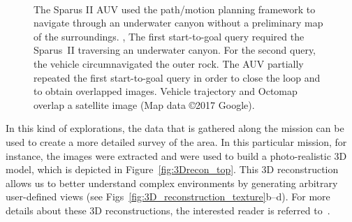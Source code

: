 \begin{figure}[htbp]
\myfloatalign
   	\quad
   	\\
   	\quad
\caption[The Sparus II AUV using the path/motion planning framework to navigate
through an underwater canyon without a preliminary map of the surroundings.]
{The Sparus II \ac{AUV} used the path/motion planning framework to navigate
through an underwater canyon without a preliminary map of the surroundings.
\protect {}, \protect
{} The first start-to-goal query required
the Sparus~II traversing an underwater canyon.
\protect {} For the second query, the vehicle
circumnavigated the outer rock. 
\protect {} The AUV partially repeated the
first start-to-goal query in order to close the loop and to obtain overlapped
images. Vehicle trajectory and Octomap overlap a satellite image (Map
data \copyright 2017 Google).}
\label{fig:SPARUS-Canyon-Scenario}
\end{figure}

In this kind of explorations, the data that is gathered along the mission can be
used to create a more detailed survey of the area. In this particular
mission, for instance, the images were extracted and were used to build a
photo-realistic \ac{3D} model, which is depicted in
Figure~\ref{fig:3Drecon_top}. This \ac{3D} reconstruction allows us to better
understand complex environments by generating arbitrary user-defined views (see
Figs~\ref{fig:3D_reconstruction_texture}b--d). For more details about these
\ac{3D} reconstructions, the interested reader is referred
to~\cite{Hernandez2016,Hernandez2016a}.


